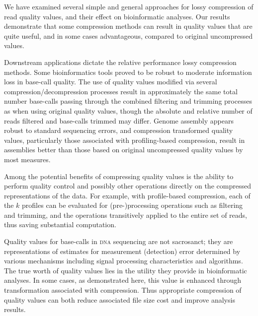 \documentclass{bmcart}
\begin{document}
We have examined several simple and general approaches for lossy
compression of read quality values, and their effect on bioinformatic
analyses. Our results demonstrate that some compression methods can
result in quality values that are quite useful, and in some cases
advantageous, compared to original uncompressed values.

Downstream applications dictate the relative performance lossy
compression methods.  Some bioinformatics tools proved to be robust to
moderate information loss in base-call quality. The use of quality
values modified via several compression/decompression processes result
in approximately the same total number base-calls passing through the
combined filtering and trimming processes as when using original
quality values, though the absolute and relative number of reads
filtered and base-calls trimmed may differ. Genome assembly appears
robust to standard sequencing errors, and compression transformed
quality values, particularly those associated with profiling-based
compression, result in assemblies better than those based on original
uncompressed quality values by most measures.

Among the potential benefits of compressing quality values is the
ability to perform quality control and possibly other operations
directly on the compressed representations of the data. For example,
with profile-based compression, each of the $k$ profiles can be
evaluated for (pre-)processing operations such as filtering and
trimming, and the operations transitively applied to the entire set of
reads, thus saving substantial computation.

Quality values for base-calls in \textsc{dna} sequencing are not
sacrosanct; they are representations of estimates for measurement
(detection) error determined by various mechanisms including signal
processing characteristics and algorithms. The true worth of quality
values lies in the utility they provide in bioinformatic analyses. In
some cases, as demonstrated here, this value is enhanced through
transformation associated with compression. Thus appropriate
compression of quality values can both reduce associated file size
cost and improve analysis results.


\end{document}
